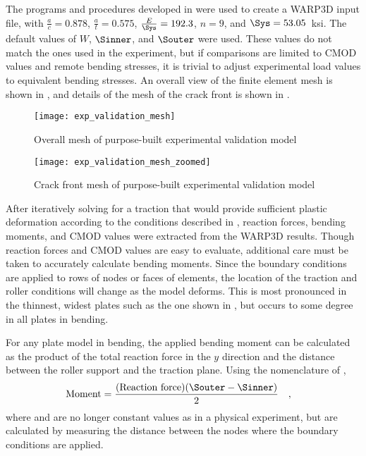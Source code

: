 
The programs and procedures developed in  were used to create a WARP3D input file, with \(\frac{a}{c}=0.878\), \(\frac{a}{t}=0.575\), \(\frac{E}{\Sys}=192.3\), \(n=9\), and \(\Sys=53.05\)~ksi.
The default values of \(W\), \(\Sinner\), and \(\Souter\) were used.
These values do not match the ones used in the experiment, but if comparisons are limited to CMOD values and remote bending stresses, it is trivial to adjust experimental load values to equivalent bending stresses.
An overall view of the finite element mesh is shown in , and details of the mesh of the crack front is shown in .
\begin{figure}[tbp]
\centering
\texttt{[image: exp\_validation\_mesh]}
\caption{\label{fig:exp_validation_mesh} Overall mesh of purpose-built experimental validation model}
\end{figure}

\begin{figure}[tbp]
\centering
\texttt{[image: exp\_validation\_mesh\_zoomed]}
\caption{\label{fig:exp_validation_mesh_zoomed} Crack front mesh of purpose-built experimental validation model}
\end{figure}

After iteratively solving for a traction that would provide sufficient plastic deformation according to the conditions described in , reaction forces, bending moments, and CMOD values were extracted from the WARP3D results.
Though reaction forces and CMOD values are easy to evaluate, additional care must be taken to accurately calculate bending moments.
Since the boundary conditions are applied to rows of nodes or faces of elements, the location of the traction and roller conditions will change as the model deforms.
This is most pronounced in the thinnest, widest plates such as the one shown in , but occurs to some degree in all plates in bending.

For any plate model in bending, the applied bending moment can be calculated as the product of the total reaction force in the $y$ direction and the distance between the roller support and the traction plane.
Using the nomenclature of ,
\begin{align}
\text{Moment} &= \frac{(\text{Reaction force})(\Souter - \Sinner)}{2}\quad,
\end{align}
where \Souter and \Sinner are no longer constant values as in a physical experiment, but are calculated by measuring the distance between the nodes where the boundary conditions are applied.

